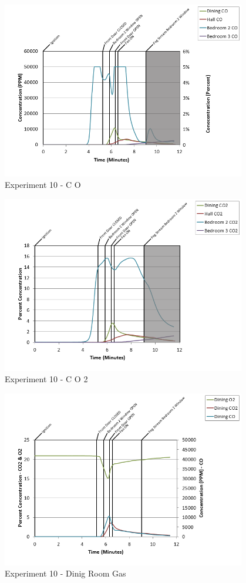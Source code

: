 \documentclass{article}
\begin{document}
\begin{appendices}
\begin{figure}[h!]
	\centering
	\includegraphics[height=3.05in]{0_Images/Results_Charts/Exp_10_Charts/CO.png}
	\caption{Experiment 10 - C O}
\end{figure}

\clearpage

\begin{figure}[h!]
	\centering
	\includegraphics[height=3.05in]{0_Images/Results_Charts/Exp_10_Charts/CO2.png}
	\caption{Experiment 10 - C O 2}
\end{figure}


\begin{figure}[h!]
	\centering
	\includegraphics[height=3.05in]{0_Images/Results_Charts/Exp_10_Charts/DinigRoomGas.png}
	\caption{Experiment 10 - Dinig Room Gas}
\end{figure}


\end{appendices}
\end{document}
